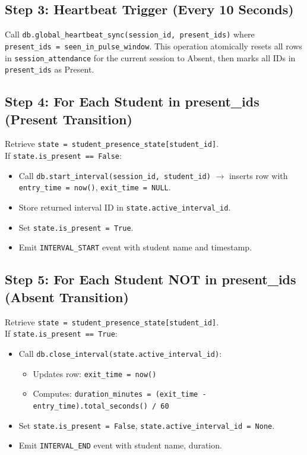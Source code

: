 \documentclass{report}
\begin{document}
\subsection*{Step 3: Heartbeat Trigger (Every 10 Seconds)}
Call \texttt{db.global\_heartbeat\_sync(session\_id, present\_ids)} where\vspace{3pt} \texttt{present\_ids = seen\_in\_pulse\_window}. This operation atomically resets all rows in\vspace{3pt} \texttt{session\_attendance} for the current session to Absent, then marks all IDs in \texttt{present\_ids}\vspace{3pt} as Present.

\subsection*{Step 4: For Each Student in present\_ids (Present Transition)}
Retrieve \texttt{state = student\_presence\_state[student\_id]}.\\
If \texttt{state.is\_present == False}:
\begin{itemize}
    \item Call \texttt{db.start\_interval(session\_id, student\_id)} $\rightarrow$ inserts row with\vspace{3pt} \texttt{entry\_time = now()}, \texttt{exit\_time = NULL}.
    \item Store returned interval ID in \texttt{state.active\_interval\_id}.
    \item Set \texttt{state.is\_present = True}.
    \item Emit \texttt{INTERVAL\_START} event with student name and timestamp.
\end{itemize}

\subsection*{Step 5: For Each Student NOT in present\_ids (Absent Transition)}
Retrieve \texttt{state = student\_presence\_state[student\_id]}.\\
If \texttt{state.is\_present == True}:
\begin{itemize}
    \item Call \texttt{db.close\_interval(state.active\_interval\_id)}:
    \begin{itemize}
        \item Updates row: \texttt{exit\_time = now()}
        \item Computes: \texttt{duration\_minutes = (exit\_time - entry\_time).total\_seconds() / 60}
    \end{itemize}
    \item Set \texttt{state.is\_present = False}, \texttt{state.active\_interval\_id = None}.
    \item Emit \texttt{INTERVAL\_END} event with student name, duration.
\end{itemize}
\end{document}
